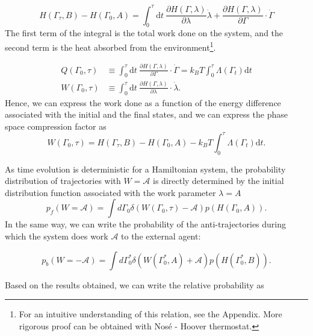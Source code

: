 \documentclass[ reprint, amsmath,amssymb, aps,]{revtex4-1}
\begin{document}
\begin{equation}
H(\Gamma_\tau,B)-H(\Gamma_0, A)=\int_0^\tau \mathrm{d}t \ \frac{\partial H(\Gamma,\lambda)}{\partial\lambda}\dot\lambda +\frac{\partial H(\Gamma,\lambda)}{\partial{\Gamma}}\cdot\dot{\Gamma}
\end{equation}
The first term of the integral is the total work done on the system, and the second term is the heat absorbed from the environment\footnote{For an intuitive understanding of this relation, see the Appendix. More rigorous proof can be obtained with Nos\'e - Hoover thermostat.}.

\begin{align}
Q(\Gamma_0,\tau)&\equiv\int_0^\tau\mathrm{d}t\  \frac{\partial H(\Gamma,\lambda)}{\partial{\Gamma}}\cdot\dot{\Gamma}=k_BT\int_0^\tau
\Lambda(\Gamma_t) \mathrm{d}t\\
W(\Gamma_0,\tau)&\equiv \int_0^\tau\mathrm{d}t\ \frac{\partial H(\Gamma,\lambda)}{\partial\lambda}\cdot\dot\lambda.
\end{align}
Hence, we can express the work done as a function of the energy difference associated with the initial and the final states, and we can express the phase space compression factor as
\begin{equation}\label{eq:work_relation}
W(\Gamma_0,\tau)=H(\Gamma_\tau,B)-H(\Gamma_0, A)-k_BT\int_0^\tau\Lambda(\Gamma_t)\mathrm{d}t.
\end{equation}
 
As time evolution is deterministic for a Hamiltonian system, the probability distribution of trajectories with $W=\mathcal{A}$ is directly determined by the initial distribution function associated with the work parameter $\lambda=A$
\begin{equation}\label{eq:pf}
p_f(W=\mathcal{A})
=\int d\Gamma_0\delta(W(\Gamma_0,\tau)-\mathcal{A}) p(H(\Gamma_0,A)).
\end{equation}
In the same way, we can write the probability of the anti-trajectories during which the system does work $\mathcal{A}$ to the external agent:

\begin{equation}\label{eq:pb}
p_b(W=-\mathcal{A})=\int d\Gamma_0^*\delta(W(\Gamma_0^*,A)+\mathcal{A}) p(H(\Gamma_0^*,B)).
\end{equation}


Based on the results obtained, we can write the relative probability as
\end{document}
